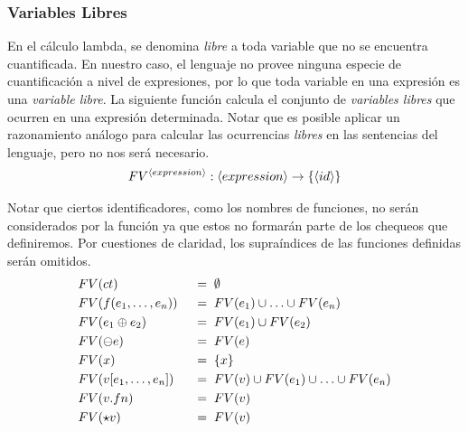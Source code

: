 \subsubsection{Variables Libres}

En el cálculo lambda, se denomina \textit{libre} a toda variable que no se encuentra cuantificada.
En nuestro caso, el lenguaje no provee ninguna especie de cuantificación a nivel de expresiones, por lo que toda variable en una expresión es una \textit{variable libre}.
La siguiente función calcula el conjunto de \textit{variables libres} que ocurren en una expresión determinada.
Notar que es posible aplicar un razonamiento análogo para calcular las ocurrencias \textit{libres} en las sentencias del lenguaje, pero no nos será necesario.
\begin{gather*}
FV^{\langle expression \rangle}: \langle expression \rangle \rightarrow \{ \langle id \rangle \}
\end{gather*}

Notar que ciertos identificadores, como los nombres de funciones, no serán considerados por la función ya que estos no formarán parte de los chequeos que definiremos.
Por cuestiones de claridad, los supraíndices de las funciones definidas serán omitidos.
\begin{alignat*}{2}
&FV(ct)
&&\;=\;
\emptyset
\\
&FV(f(e_1, \ldots, e_n))
&&\;=\;
FV(e_1) \cup \ldots \cup FV(e_n)
\\
&FV(e_1 \oplus e_2)
&&\;=\;
FV(e_1) \cup FV(e_2)
\\
&FV(\ominus e)
&&\;=\;
FV(e)
\\
&FV(x)
&&\;=\;
\{ x \}
\\
&FV(v [e_1, \ldots, e_n])
&&\;=\;
FV(v) \cup FV(e_1) \cup \ldots \cup FV(e_n)
\\
&FV(v.fn)
&&\;=\;
FV(v)
\\
&FV(\star v)
&&\;=\;
FV(v)
\end{alignat*}

